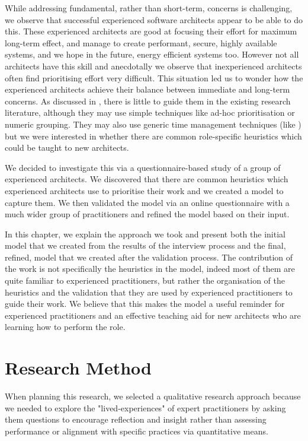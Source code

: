 While addressing fundamental, rather than short-term, concerns is challenging, we observe that successful experienced software architects appear to be able to do this.  These experienced architects are good at focusing their effort for maximum long-term effect, and manage to create performant, secure, highly available systems, and we hope in the future, energy efficient systems too. However not all architects have this skill and anecdotally we observe that inexperienced architects often find prioritising effort very difficult.  This situation led us to wonder how the experienced architects achieve their balance between immediate and long-term concerns.  As discussed in , there is little to guide them in the existing research literature, although they may use simple techniques like ad-hoc prioritisation or numeric grouping.  They may also use generic time management techniques (like \cite{allen2015-gettingthingsdone}) but we were interested in whether there are common role-specific heuristics which could be taught to new architects.

We decided to investigate this via a questionnaire-based study of a group of experienced architects.  We discovered that there are common heuristics which experienced architects use to prioritise their work and we created a model to capture them.  We then validated the model via an online questionnaire with a much wider group of practitioners and refined the model based on their input.

In this chapter, we explain the approach we took and present both the initial model that we created from the results of the interview process and the final, refined, model that we created after the validation process.  The contribution of the work is not specifically the heuristics in the model, indeed most of them are quite familiar to experienced practitioners, but rather the organisation of the heuristics and the validation that they are used by experienced practitioners to guide their work.  We believe that this makes the model a useful reminder for experienced practitioners and an effective teaching aid for new architects who are learning how to perform the role.

\section{Research Method}

When planning this research, we selected a qualitative research approach because we needed to explore the "lived-experiences" of expert practitioners by asking them questions to encourage reflection and insight \cite{lapan2012-qualitativeresearch} rather than assessing performance or alignment with specific practices via quantitative means.


